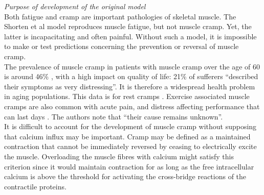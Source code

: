 \documentclass[fleqn,10pt]{physiome}
\begin{document}
\textit{Purpose of development of the original model}\\\newline
Both fatigue and cramp are important pathologies of skeletal muscle. The Shorten et al\cite{shorten2007mathematical} model reproduces muscle fatigue, but not muscle cramp. Yet, the latter is incapacitating and often painful. Without such a model, it is impossible to make or test predictions concerning the prevention or reversal of muscle cramp.\\\newline
The prevalence of muscle cramp in patients with muscle cramp over the age of 60 is around 46\% \citep{maisonneuve2016prevalence}, with a high impact on quality of life: 21\% of sufferers “described their symptoms as very distressing”. It is therefore a widespread health problem in aging populations. This data is for rest cramps  \citep{naylor1994general}. Exercise associated muscle cramps are also common with acute pain, and distress affecting performance that can last days \citep{millerexercise}. The authors note that “their cause remains unknown”.\\\newline
It is difficult to account for the development of muscle cramp without supposing that calcium influx may be important. Cramp may be defined as a maintained contraction that cannot be immediately reversed by ceasing to electrically excite the muscle. Overloading the muscle fibres with calcium might satisfy this criterion since it would maintain contraction for as long as the free intracellular calcium is above the threshold for activating the cross-bridge reactions of the contractile proteins.
\end{document}
